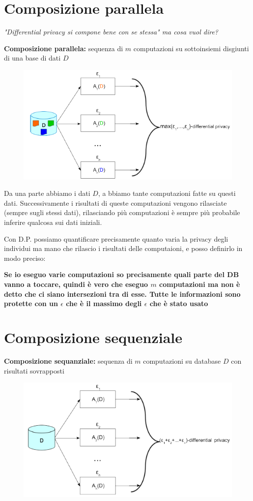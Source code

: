 \documentclass{report}
\begin{document}
\section{Composizione parallela}
\begin{center}
    \textit{"Differential privacy si compone bene con se stessa" ma cosa vuol dire?}
\end{center}
\noindent \textbf{Composizione parallela:} sequenza di $m$ computazioni su sottoinsiemi disgiunti di una base di dati $D$

\begin{figure}[H]
        \centering
        \includegraphics[width=0.4\linewidth]{images/ParallelC.png}
\end{figure}


\noindent Da una parte abbiamo i dati $D$, a bbiamo tante computazioni fatte su questi dati. Successivamente i risultati di queste computazioni vengono rilasciate
(sempre sugli stessi dati), rilasciando più computazioni è sempre più probabile inferire qualcosa sui dati iniziali.

\noindent Con D.P. possiamo quantificare precisamente quanto varia la privacy degli individui ma mano che rilascio i risultati delle computaioni, e posso definirlo in modo preciso:

\noindent \textbf{Se io eseguo varie computazioni so precisamente quali parte del DB vanno a toccare, quindi è vero che eseguo $m$ computazioni ma non è detto che ci siano intersezioni tra di esse.
Tutte le informazioni sono protette con un $\epsilon$ che è il massimo degli $\epsilon$ che è stato usato}

\section{Composizione sequenziale}
\noindent \textbf{Composizione sequanziale:} sequenza di $m$ computazioni su database $D$ con risultati sovrapposti

\begin{figure}[H]
        \centering
        \includegraphics[width=0.4\linewidth]{images/sequenziale.png}
\end{figure}
\end{document}
